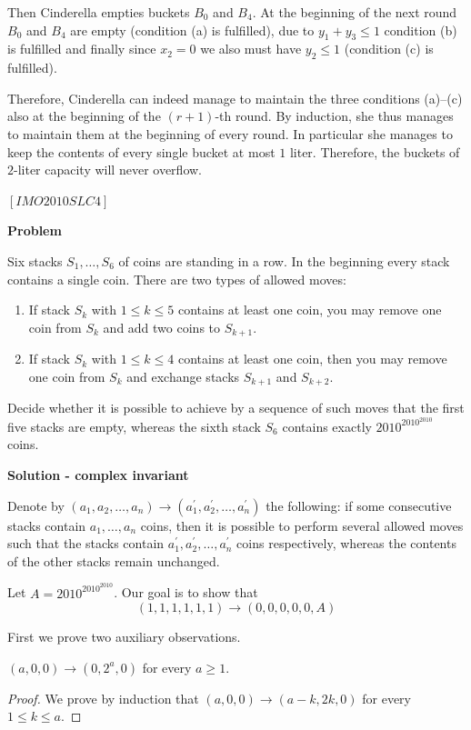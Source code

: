 \begin{problem}
 Then Cinderella empties buckets $B_0$ and $B_4$. At the beginning of the next round $B_0$ and $B_4$ are empty (condition (a) is fulﬁlled), due to $y_1+y_3 \le 1$ condition (b) is fulﬁlled and ﬁnally since $x_2 = 0$ we also must have $y_2 \le 1$ (condition (c) is fulﬁlled). 
 
 Therefore, Cinderella can indeed manage to maintain the three conditions (a)–(c) also at the beginning of the $(r + 1)$-th round. By induction, she thus manages to maintain them at the beginning of every round. In particular she manages to keep the contents of every single bucket at most $1$ liter. Therefore, the buckets of $2$-liter capacity will never overﬂow.


\end{problem}

\begin{problem}
$[IMO2010SLC4]$

\textbf{Problem}

Six stacks $S_1,\dots,S_6$ of coins are standing in a row. In the beginning every stack contains a single coin. There are two types of allowed moves: 
\begin{enumerate}
\item \label{move1} If stack $S_k$ with $1\le k \le 5$ contains at least one coin, you may remove one coin from $S_k$ and add two coins to $S_{k+1}$.
\item If stack $S_k$ with $1 \le k \le 4$ contains at least one coin, then you may remove one coin from $S_k$ and exchange stacks $S_{k+1}$ and $S_{k+2}$. 
 \end{enumerate}
 Decide whether it is possible to achieve by a sequence of such moves that the ﬁrst ﬁve stacks are empty, whereas the sixth stack $S_6$ contains exactly $2010^{2010^{2010}}$ coins.


\textbf{Solution - complex invariant }

Denote by $(a_1,a_2,\dots,a_n)  \rightarrow (a_1^\prime,a_2^\prime,\dots,a_n^\prime)$ the following: if some consecutive stacks contain $a_1,\dots,a_n$ coins, then it is possible to perform several allowed moves such that the stacks contain $a_1^\prime,a_2^\prime,\dots,a_n^\prime$ coins respectively, whereas the contents of the other stacks remain unchanged. 

Let $A=2010^{2010^{2010}}$. Our goal is to show that $$(1,1,1,1,1,1) \rightarrow (0,0,0,0,0,A)$$

First we prove two auxiliary observations. 
\begin{lemma}
\label{lemma1}
$(a,0,0)\rightarrow (0,2^a,0)$ for every $a\ge 1$. 
\end{lemma}
\begin{proof}
We prove by induction that $(a,0,0) \rightarrow (a-k,2k,0)$ for every $1\le k \le a$. 


\end{proof}
\end{problem}
